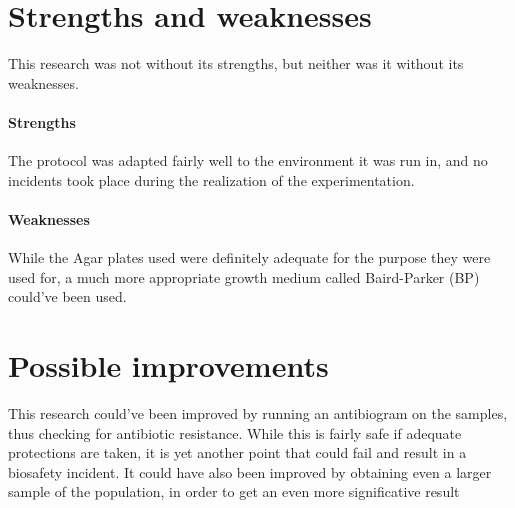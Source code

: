 \section{Strengths and weaknesses}
This research was not without its strengths, but neither was it without its weaknesses.
\paragraph{Strengths} The protocol was adapted fairly well to the environment it was run in, and no incidents took place during the realization of the experimentation.
\paragraph{Weaknesses} While the Agar plates used were definitely adequate for the purpose they were used for, a much more appropriate growth medium called Baird-Parker (BP) could've been used.
\section{Possible improvements}
This research could've been improved by running an antibiogram on the samples, thus checking for antibiotic resistance. While this is fairly safe if adequate protections are taken, it is yet another point that could fail and result in a biosafety incident.\newline
It could have also been improved by obtaining even a larger sample of the population, in order to get an even more significative result